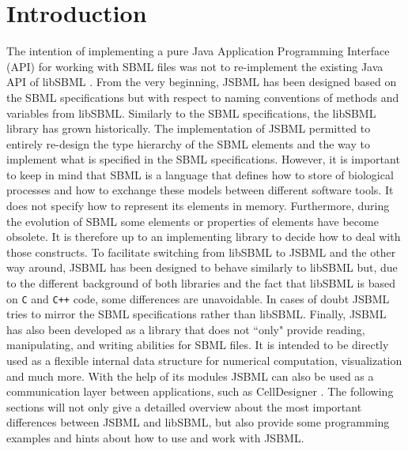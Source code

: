 \section{Introduction}

The intention of implementing a pure Java\texttrademark{}
Application Programming Interface (API) for working with SBML files was not to
re-implement the existing Java API of libSBML
%
\citep{Bornstein2008}.
From the very beginning, JSBML
%
has been designed based on the SBML specifications \citep{Hucka2003, Hucka2008,
Hucka2010a} but with respect to naming conventions of methods and variables from
libSBML. Similarly to the SBML specifications,
%
the libSBML library has grown historically. The implementation of JSBML
permitted to entirely re-design the type hierarchy of the SBML elements and the
way to implement what is specified in the SBML specifications. However, it is
important to keep in mind that SBML is a language that defines how to store of
biological processes and how to exchange these models between
%
different software tools. It
does not specify how to represent its elements in memory. Furthermore, during
the evolution of SBML some elements or properties of elements have become
obsolete.
%
It is therefore up to an implementing library to
decide how to deal with those constructs. To facilitate switching from libSBML
to JSBML and the other way around, JSBML has been designed to behave similarly
to libSBML but, due to the different background of both libraries and the fact
that libSBML is based on \texttt{C}
%
and \texttt{C++}
%
code, some differences are unavoidable. In cases of doubt JSBML tries to mirror
the SBML specifications rather than libSBML. Finally, JSBML has also been
developed as a library that does not ``only" provide reading, manipulating, and
writing abilities for SBML files. It is intended to be directly used as a
flexible internal data structure for numerical computation, visualization and
much more. With the help of its modules JSBML can also be used as a
communication layer between applications, such as CellDesigner
\citep{Funahashi2003}. The following sections will not only give a detailled
overview about the most important differences between JSBML and libSBML, but
also provide some programming examples and hints about how to use and work with
JSBML.


